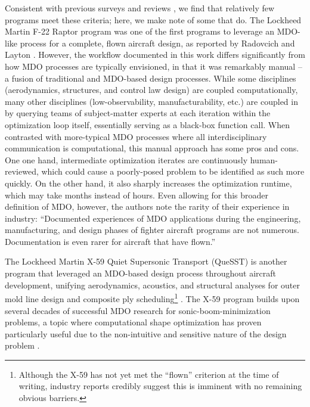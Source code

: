 
Consistent with previous surveys and reviews \cite{kroo_multidisciplinary_1997, agte_mdo_2010, ashley_making_1982, haftka_multidisciplinary_1997,gazaix_industrialization_2017, belie_nontechnical_2002, Shahpar_2011}, we find that relatively few programs meet these criteria; here, we make note of some that do. The Lockheed Martin F-22 Raptor program was one of the first programs to leverage an MDO-like process for a complete, flown aircraft design, as reported by Radovcich and Layton \cite{radovcich_f22_1998}. However, the workflow documented in this work differs significantly from how MDO processes are typically envisioned, in that it was remarkably manual -- a fusion of traditional and MDO-based design processes. While some disciplines (aerodynamics, structures, and control law design) are coupled computationally, many other disciplines (low-observability, manufacturability, etc.) are coupled in by querying teams of subject-matter experts at each iteration within the optimization loop itself, essentially serving as a black-box function call. When contrasted with more-typical MDO processes where all interdisciplinary communication is computational, this manual approach has some pros and cons. One one hand, intermediate optimization iterates are continuously human-reviewed, which could cause a poorly-posed problem to be identified as such more quickly. On the other hand, it also sharply increases the optimization runtime, which may take months instead of hours. Even allowing for this broader definition of MDO, however, the authors note the rarity of their experience in industry: ``Documented experiences of MDO applications during the engineering, manufacturing, and design phases of fighter aircraft programs are not numerous. Documentation is even rarer for aircraft that have flown.''

The Lockheed Martin X-59 Quiet Supersonic Transport (QueSST) is another program that leveraged an MDO-based design process throughout aircraft development, unifying aerodynamics, acoustics, and structural analyses for outer mold line design and composite ply scheduling\footnote{Although the X-59 has not yet met the ``flown'' criterion at the time of writing, industry reports credibly suggest this is imminent with no remaining obvious barriers.} \cite{x59_nasa_nas, x59_nasa_sc19, x59_compositeworld}. The X-59 program builds upon several decades of successful MDO research for sonic-boom-minimization problems, a topic where computational shape optimization has proven particularly useful due to the non-intuitive and sensitive nature of the design problem \cite{choi_multifidelity_2008}.

